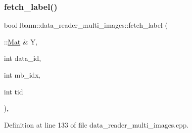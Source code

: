\mbox{\label{classlbann_1_1data__reader__multi__images_a96baf61a6207a76060afeaa31b55b671}} 
\subsubsection{\texorpdfstring{fetch\+\_\+label()}{fetch\_label()}}
{\footnotesize\ttfamily bool lbann\+::data\+\_\+reader\+\_\+multi\+\_\+images\+::fetch\+\_\+label (\begin{DoxyParamCaption}\item[{\+::\hyperlink{base_8hpp_a68f11fdc31b62516cb310831bbe54d73}{Mat} \&}]{Y,  }\item[{int}]{data\+\_\+id,  }\item[{int}]{mb\+\_\+idx,  }\item[{int}]{tid }\end{DoxyParamCaption})\hspace{0.3cm}{\ttfamily [override]}, {\ttfamily [protected]}}



Definition at line 133 of file data\+\_\+reader\+\_\+multi\+\_\+images.\+cpp.


